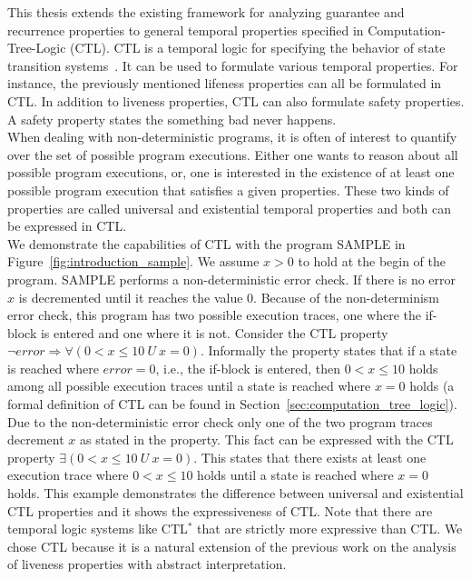 \documentclass[11pt,a4paper,titlepage]{article}
\theoremstyle{definition}
\begin{document}
This thesis extends the existing framework for analyzing guarantee and recurrence properties to 
general temporal properties specified in Computation-Tree-Logic (CTL).
CTL is a temporal logic for specifying the behavior of state transition systems~\cite{baier2008principles}. 
It can be used to formulate various temporal properties. For instance, the previously mentioned lifeness properties can all be formulated in CTL. 
In addition to liveness properties, CTL can also formulate safety properties. A safety property states the something bad never happens.\\
When dealing with non-deterministic programs, it is often of interest to quantify over the set of possible program executions. 
Either one wants to reason about all possible program executions, or, one is interested in the existence 
of at least one possible program execution that satisfies a given properties. 
These two kinds of properties are called universal and existential temporal properties and both can be expressed in CTL.\\

We demonstrate the capabilities of CTL with the program \textsf{SAMPLE} in Figure~\ref{fig:introduction_sample}. 
We assume $x>0$ to hold at the begin of the program.
\textsf{SAMPLE} performs a non-deterministic error check. If there is no error $x$ is decremented until it reaches the value $0$.
Because of the non-determinism error check, this program has two possible execution traces, one where the if-block is entered and one
where it is not. Consider the CTL property $\neg error \Rightarrow \forall(0 < x \leq 10 \ U \ x = 0)$. 
Informally the property states that if a state is reached where $error = 0$, i.e., the
if-block is entered, then $0 < x \leq 10$ holds among all possible execution traces until a state is reached where $x=0$ holds
(a formal definition of CTL can be found in Section~\ref{sec:computation_tree_logic}). Due to the non-deterministic error check only one of the
two program traces decrement $x$ as stated in the property. 
This fact can be expressed with the CTL property $\exists(0 < x \leq 10 \ U \ x = 0)$. This states that there exists at least one execution trace
where $0 < x \leq 10$ holds until a state is reached where $x = 0$ holds. This example demonstrates the difference between universal and existential 
CTL properties and it shows the expressiveness of CTL. Note that there are temporal logic systems like CTL$^{*}$
that are strictly more expressive than CTL. We chose CTL because it is a natural extension of 
the previous work on the analysis of liveness properties with abstract interpretation.\\
\end{document}
